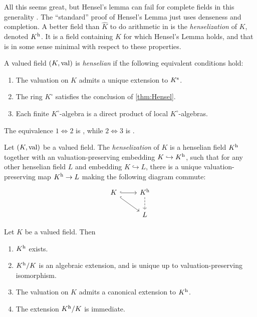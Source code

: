 All this seems great, but Hensel's lemma can fail for complete fields in this 
generality \cite[2.4.6]{engler-prestel}. The ``standard'' proof of Hensel's 
Lemma just uses denseness and completion. A better field than $\widehat K$ to 
do arithmetic in is the \emph{henselization} of $K$, denoted 
$K^{\mathrm{h}}$. It is a field containing $K$ for which Hensel's Lemma 
holds, and that is in some sense minimal with respect to these properties. 

\begin{definition}
A valued field $(K,\operatorname{val})$ is \emph{henselian} if the following equivalent 
conditions hold:
\begin{enumerate}
\item
The valuation on $K$ admits a unique extension to $K^{\mathrm{s}}$. 

\item
The ring $K^\circ$ satisfies the conclusion of \autoref{thm:Hensel}. 

\item
Each finite $K^\circ$-algebra is a direct product of local $K^\circ$-algebras. 
\end{enumerate}
\end{definition}

The equivalence $1\Leftrightarrow 2$ is \cite[4.1.3]{engler-prestel}, while 
$2\Leftrightarrow 3$ is \cite[I \S 1.5]{raynaud-1970}. 

\begin{definition}
Let $(K,\operatorname{val})$ be a valued field. The \emph{henselization} of $K$ is 
a henselian field $K^{\mathrm{h}}$ together with an valuation-preserving 
embedding $K\hookrightarrow K^{\mathrm{h}}$, such that for any other 
henselian field $L$ and embedding $K\hookrightarrow L$, there is a unique 
valuation-preserving map $K^{\mathrm{h}}\to L$ making the following diagram 
commute:
\[\begin{tikzcd}
  K\ar[r, hook] \ar[dr, hook]
    & K^\henselization \ar[d, dashed] \\
  & L 
\end{tikzcd}
\]
\end{definition}

\begin{proposition}
Let $K$ be a valued field. Then 
\begin{enumerate}
\item
$K^{\mathrm{h}}$ exists. 

\item
$K^{\mathrm{h}}/K$ is an algebraic extension, and is unique up to 
valuation-preserving isomorphism. 

\item
The valuation on $K$ admits a canonical extension to $K^{\mathrm{h}}$. 

\item
The extension $K^{\mathrm{h}}/K$ is immediate. 
\end{enumerate}
\end{proposition}

